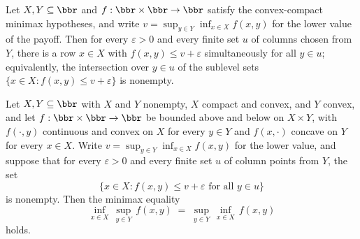 \begin{lemma}
\label{OnlineLearning.finite_sublevel_intersections_by_separation}
\leanok
{}
Let $X, Y \subseteq \bbr$ and $f : \bbr \times \bbr \to \bbr$ satisfy the convex-compact
minimax hypotheses, and write $v = \sup_{y \in Y} \inf_{x \in X} f(x,y)$ for the lower
value of the payoff. Then for every $\varepsilon > 0$ and every finite set $u$ of
columns chosen from $Y$, there is a row $x \in X$ with $f(x,y) \le v + \varepsilon$
simultaneously for all $y \in u$; equivalently, the intersection over $y \in u$ of the
sublevel sets $\{x \in X : f(x,y) \le v + \varepsilon\}$ is nonempty.
\end{lemma}

\begin{theorem}
\label{OnlineLearning.convex_compact_minimax_of_finite_sublevel_intersections}
\leanok
{}
Let $X, Y \subseteq \bbr$ with $X$ and $Y$ nonempty, $X$ compact and convex, and $Y$
convex, and let $f : \bbr \times \bbr \to \bbr$ be bounded above and below on $X \times
Y$, with $f(\cdot, y)$ continuous and convex on $X$ for every $y \in Y$ and $f(x,
\cdot)$ concave on $Y$ for every $x \in X$. Write $v = \sup_{y \in Y} \inf_{x \in X}
f(x,y)$ for the lower value, and suppose that for every $\varepsilon > 0$ and every
finite set $u$ of column points from $Y$, the set
\[
  \{x \in X : f(x,y) \leq v + \varepsilon \text{ for all } y \in u\}
\]
is nonempty. Then the minimax equality
\[
  \inf_{x \in X}\,\sup_{y \in Y}\,f(x,y) \;=\; \sup_{y \in Y}\,\inf_{x \in X}\,f(x,y)
\]
holds.
\end{theorem}

